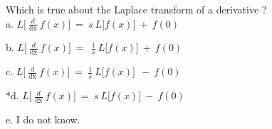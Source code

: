 
Which is true about the Laplace transform of a derivative ? \\

a.
\(L\lbrack\ \frac{d}{\text{dx}}\ f(x)\rbrack\  = \ s\ L\lbrack f(x)\rbrack\  + \ f(0)\)

b.
\(L\lbrack\ \frac{d}{\text{dx}}\ f(x)\rbrack\  = \ \ \frac{1}{s}\ L\lbrack f(x)\rbrack\  + \ f(0)\)

c.
\(L\lbrack\ \frac{d}{\text{dx}}\ f(x)\rbrack\  = \ \frac{1}{s}\ L\lbrack f(x)\rbrack\ \  - \ f(0)\)

*d.
\(L\lbrack\ \frac{d}{\text{dx}}\ f(x)\rbrack\  = \ s\ L\lbrack f(x)\rbrack\  - \ f(0)\)

e. I do not know. \\
